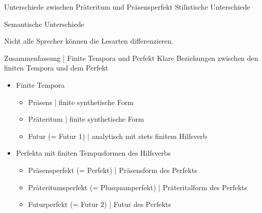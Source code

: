 \begin{frame}
  {Unterschiede zwischen Präteritum und Präsensperfekt}
  Stilistische Unterschiede\\
  \Halbzeile
  \begin{exe}
  \ex\label{ex:analytischetempora226}
  \begin{xlist}
  \end{xlist}
  \end{exe}
  \Zeile
  Semantische Unterschiede\\
  \Halbzeile
  \begin{exe}
  \ex\label{ex:analytischetempora229}
  \begin{xlist}
  \end{xlist}
  \onslide<+->
  \centering 
  Nicht alle Sprecher können die Lesarten differenzieren.
  \end{exe}
\end{frame}

\begin{frame}
  {Zusammenfassung | Finite Tempora und Perfekt}
  \onslide<+->
  \onslide<+->
  Klare Beziehungen zwischen den finiten Tempora und dem Perfekt\\
  \Zeile
  \begin{itemize}[<+->]
    \item Finite Tempora
      \begin{itemize}[<+->]
        \item Präsens | finite synthetische Form
        \item Präteritum | finite synthetische Form
        \item Futur (= Futur 1) | analytisch mit stets finitem Hilfsverb
      \end{itemize}
     \Zeile 
    \item \alert{Perfekta mit finiten Tempusformen des Hilfsverbs}
      \begin{itemize}[<+->]
        \item Präsensperfekt (= Perfekt) | Präsensform des Perfekts
        \item Präteritumsperfekt (= Plusquamperfekt) | Präteritalform des Perfekts
        \item Futurperfekt (= Futur 2) | Futur des Perfekts
      \end{itemize}
  \end{itemize}
\end{frame}


